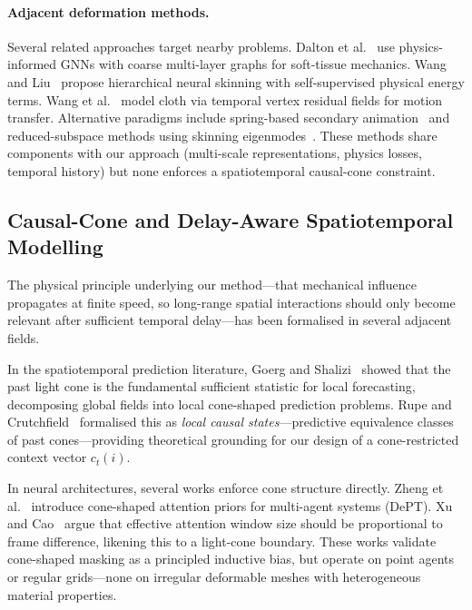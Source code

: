 \documentclass[10pt,twocolumn]{article}
\begin{document}
\paragraph{Adjacent deformation methods.}
Several related approaches target nearby problems. Dalton et al.~\cite{dalton2023softtissue} use physics-informed GNNs with coarse multi-layer graphs for soft-tissue mechanics. Wang and Liu~\cite{wang2025hierarchical} propose hierarchical neural skinning with self-supervised physical energy terms. Wang et al.~\cite{wang2024apparel} model cloth via temporal vertex residual fields for motion transfer. Alternative paradigms include spring-based secondary animation~\cite{akyurek2025spring} and reduced-subspace methods using skinning eigenmodes~\cite{benchekroun2023eigenmodes}. These methods share components with our approach (multi-scale representations, physics losses, temporal history) but none enforces a spatiotemporal causal-cone constraint.

\subsection{Causal-Cone and Delay-Aware Spatiotemporal Modelling}

The physical principle underlying our method---that mechanical influence propagates at finite speed, so long-range spatial interactions should only become relevant after sufficient temporal delay---has been formalised in several adjacent fields.

In the spatiotemporal prediction literature, Goerg and Shalizi~\cite{goerg2012licors,goerg2013mixed} showed that the past light cone is the fundamental sufficient statistic for local forecasting, decomposing global fields into local cone-shaped prediction problems. Rupe and Crutchfield~\cite{rupe2018local} formalised this as \emph{local causal states}---predictive equivalence classes of past cones---providing theoretical grounding for our design of a cone-restricted context vector $c_t(i)$.

In neural architectures, several works enforce cone structure directly. Zheng et al.~\cite{zheng2021dept} introduce cone-shaped attention priors for multi-agent systems (DePT). Xu and Cao~\cite{xu2024msc} argue that effective attention window size should be proportional to frame difference, likening this to a light-cone boundary. These works validate cone-shaped masking as a principled inductive bias, but operate on point agents or regular grids---none on irregular deformable meshes with heterogeneous material properties.
\end{document}
